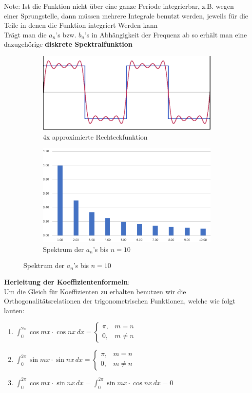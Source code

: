 \documentclass[12pt,a4paper]{article}
\newcommand{\nl}{\\[0.1cm]}
\begin{document}
Note: Ist die Funktion nicht über eine ganze Periode integrierbar, z.B. wegen einer Sprungstelle, dann müssen mehrere Integrale benutzt werden, jeweils für die Teile in denen die Funktion integriert Werden kann\\
Trägt man die $a_n$'s bzw. $b_n$'s in Abhängigkeit der Frequenz ab so erhält man eine dazugehörige \textbf{diskrete Spektralfunktion}\\
\begin{figure}[H]
\begin{subfigure}{0.4\textwidth}
\includegraphics[width=\textwidth]{./resources/rec_sins.png}
\caption{4x approximierte Rechteckfunktion}
\end{subfigure}
\hfill
\begin{subfigure}{0.4\textwidth}
\includegraphics[width=\textwidth]{./resources/freq_diag_rec.png}
\caption{Spektrum der $a_n$'s bis $n=10$}
\end{subfigure}
\end{figure}
\textbf{Herleitung der Koeffizientenformeln}:\nl
Um die Gleich für Koeffizienten zu erhalten benutzen wir die Orthogonalitätsrelationen der trigonometrischen Funktionen, welche wie folgt lauten:
\begin{enumerate}
\item $\displaystyle \int_0^{2\pi} \cos mx \cdot \cos nx \,dx = \begin{cases}\pi ,& m=n\\0 ,& m\neq n\end{cases}$
\item $\displaystyle \int_0^{2\pi} \sin mx \cdot \sin nx \,dx = \begin{cases}\pi ,& m=n\\0 ,& m\neq n\end{cases}$
\item $\displaystyle \int_0^{2\pi} \cos mx \cdot \sin nx \,dx = \int_0^{2\pi} \sin mx \cdot \cos nx \,dx = 0$
\end{enumerate}
\end{document}
